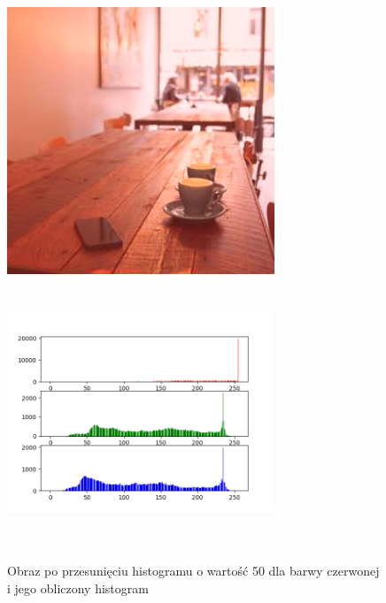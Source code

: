 \documentclass[a4paper,12pt]{book}
\begin{document}
\begin{figure}[H]
	\caption{Obraz po przesunięciu histogramu o wartość 50 dla barwy czerwonej i jego obliczony histogram}
	\includegraphics[width=8cm, height=8cm]{6-2/move-histogram-image-coffee-(50,0,0).png}
	\includegraphics[width=8cm, height=8cm]{6-2/move-histogram-coffee-(50,0,0).png}
\end{figure}
\end{document}
